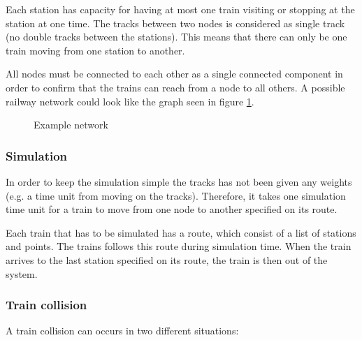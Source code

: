 \documentclass[10pt,a4paper]{article}
\begin{document}
Each station has capacity for having at most one train visiting or stopping at the station at one time.
The tracks between two nodes is considered as single track (no double tracks between the stations). This means that there can only be one train moving from one station to another.  
 
All nodes must be connected to each other as a single connected component in order to confirm that the trains can reach from a node to all others.  A possible railway network could look like the graph seen in figure \ref{fig:graph}.

\begin{figure}[h]
\centering
{}
 \caption{Example network}

 \label{fig:graph}
\end{figure}

\subsubsection{Simulation}
 
In order to keep the simulation simple the tracks has not been given any weights (e.g. a time unit from moving on the tracks). Therefore, it takes one simulation time unit for a train to move from one node to another specified on its route.
 
Each train that has to be simulated has a route, which consist of a list of stations and points. The trains follows this route during simulation time. When the train arrives to the last station specified on its route, the train is then out of the system.
 
\subsubsection{Train collision}
 
A train collision can occurs in two different situations:
\end{document}
